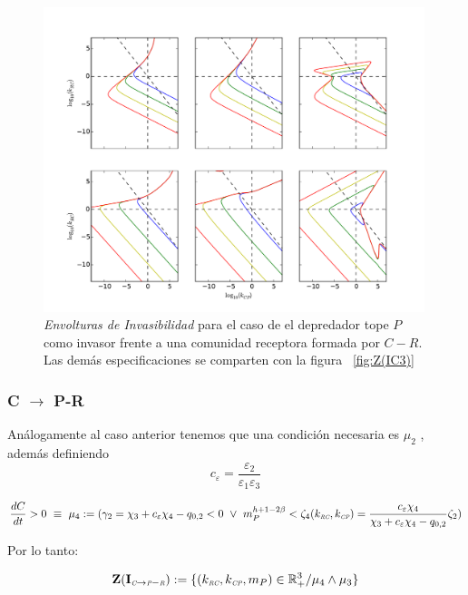 \begin{figure}[!htbp]
  \centering
  \includegraphics[width = 0.99\textwidth]{./Plots/Z(IC4)AcGrGr.pdf}
  \caption[Env $Z(IC4)$]{\emph{Envolturas de Invasibilidad} para el caso de el depredador tope $P$ como invasor frente a una comunidad receptora formada por $C-R$. Las dem\'as especificaciones se comparten con la figura ~\ref{fig:Z(IC3)}}
  \label{fig:Z(IC4)}
\end{figure}

\subsubsection{C $\to$ P-R}
An\'alogamente al caso anterior tenemos que una condici\'on necesaria es $\mu_2$ , adem\'as definiendo
\begin{equation}
  c_\varepsilon = \frac{\varepsilon_2}{\varepsilon_1\varepsilon_3}
\end{equation}

\begin{equation}
\frac{dC}{dt}  >0 \ \equiv \ \mu_4 := (\gamma_2 = \chi_3 + c_\varepsilon \chi_4 - q_{0,2} < 0 \ \lor \  m_P^{h + 1 - 2\beta} < \zeta_4(k_{\textit{\tiny RC}},k_{\textit{\tiny CP}}) = \frac{c_\varepsilon \chi_4}{\chi_3 + c_\varepsilon \chi_4 - q_{0,2}} \zeta_2 )
\end{equation}


Por lo tanto:

\begin{equation}
\mathbf{Z(I_{\textit{\tiny C} \to \textit{\tiny P}-\textit{\tiny R}})} := \{ (k_{\textit{\tiny RC}},k_{\textit{\tiny CP}},m_P) \in \mathbb{R}^3_+ / \mu_4 \land \mu_3 \}
\end{equation}

